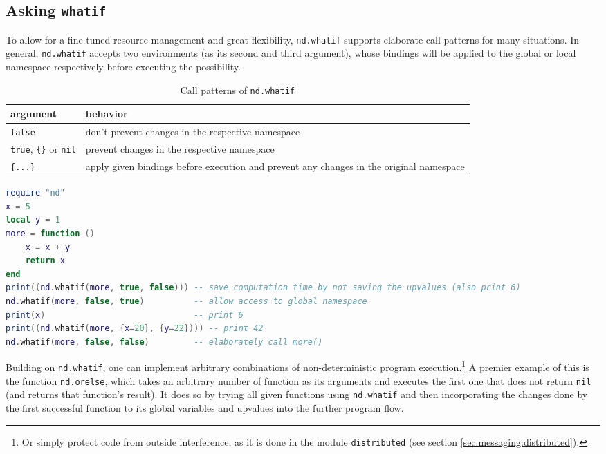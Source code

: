 \subsection{Asking \texttt{whatif}}
\label{sec:whatif}

To allow for a fine-tuned resource management and great flexibility, \texttt{nd.whatif} supports elaborate call patterns for many situations. In general, \texttt{nd.whatif} accepts two environments (as its second and third argument), whose bindings will be applied to the global or local namespace respectively before executing the possibility.

\begin{comment}
TODO: possibly update nd.whatif to include an option (_true_ or nil?) to ERADICATE said namespace and execute in plain environment.
\end{comment}

 \begin{table}[h]
 \caption{Call patterns of \texttt{nd.whatif}}
 \begin{tabular}{|l|p{300pt}|}
\hline
argument  & behavior\\
\hline
\hline
\texttt{false} & don't prevent changes in the respective namespace\\
\hline
\texttt{true}, \texttt{\{\}} or \texttt{nil} & prevent changes in the respective namespace \\
\hline
\texttt{\{...\}} & apply given bindings before execution and prevent any changes in the original namespace\\
\hline
 \end{tabular}
 \label{tab:whatif}
 \end{table}

\begin{lstlisting}[language=lua, caption={Example for the call patterns of \texttt{nd.whatif} (see table \ref{tab:whatif})}, label=lst:whatif, name=lst:whatif]
require "nd"
x = 5
local y = 1
more = function ()
	x = x + y
	return x
end
print((nd.whatif(more, true, false))) -- save computation time by not saving the upvalues (also print 6)
nd.whatif(more, false, true)          -- allow access to global namespace
print(x)                              -- print 6
print((nd.whatif(more, {x=20}, {y=22}))) -- print 42
nd.whatif(more, false, false)         -- elaborately call more()
\end{lstlisting}

Building on \texttt{nd.whatif}, one can implement arbitrary combinations of non-deterministic program execution.\footnote{Or simply protect code from outside interference, as it is done in the module \texttt{distributed} (see section \ref{sec:messaging:distributed}).} A premier example of this is the function \texttt{nd.orelse}, which takes an arbitrary number of function as its arguments and executes the first one that does not return \texttt{nil} (and returns that function's result). It does so by trying all given functions using \texttt{nd.whatif} and then incorporating the changes done by the first successful function to its global variables and upvalues into the further program flow.


